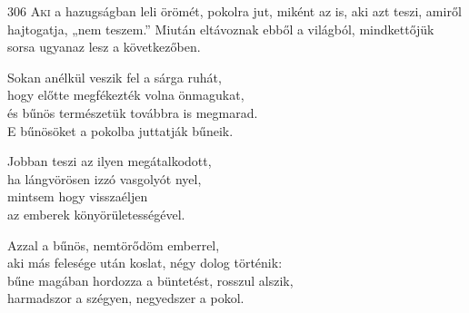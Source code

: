 
\vspace*{-\baselineskip}

\begin{firstdhpverse}[-10pt]{306}
\lettrine[slope=0.5em]{A}{ki} {\LettrineTextFont a hazugságban leli örömét, pokolra jut,}\newline
miként az is, aki azt teszi,\newline
amiről hajtogatja, „nem teszem.”\newline
Miután eltávoznak ebből a világból,\newline
mindkettőjük sorsa ugyanaz lesz a következőben.
\end{firstdhpverse}

\begin{dhpverse}

 Sokan anélkül veszik fel a sárga ruhát,\\
hogy előtte megfékezték volna önmagukat,\\
és bűnös természetük továbbra is megmarad.\\
E bűnösöket a pokolba juttatják bűneik.

 Jobban teszi az ilyen megátalkodott,\\
ha lángvörösen izzó vasgolyót nyel,\\
mintsem hogy visszaéljen\\
az emberek könyörületességével.

 Azzal a bűnös, nemtörődöm emberrel,\\
aki más felesége után koslat, négy dolog történik:\\
bűne magában hordozza a büntetést, rosszul alszik,\\
harmadszor a szégyen, negyedszer a pokol.

\end{dhpverse}
\newpage
